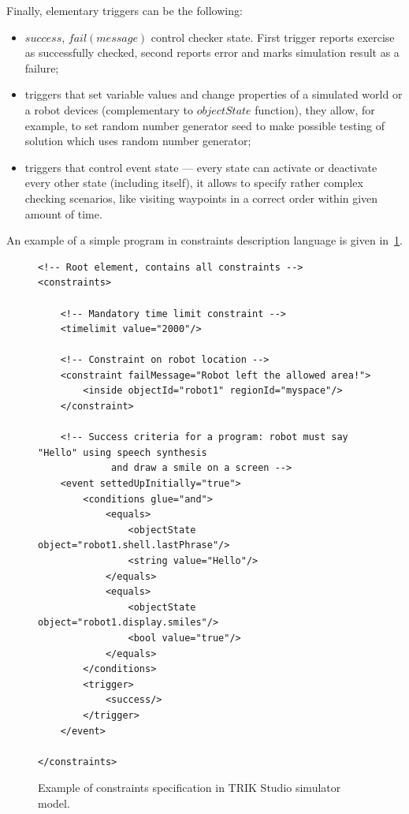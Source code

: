 \documentclass[conference]{IEEEtran}
\begin{document}
{Finally, elementary triggers can be the following:
\begin{itemize}
    \item $success$, $fail(message)$ control checker state. First trigger reports exercise as successfully checked, second reports error and marks simulation result as a failure;
    \item triggers that set variable values and change properties of a simulated world or a robot devices (complementary to $objectState$ function), they allow, for example, to set random number generator seed to make possible testing of solution which uses random number generator;
    \item triggers that control event state --- every state can activate or deactivate every other state (including itself), it allows to specify rather complex checking scenarios, like visiting waypoints in a correct order within given amount of time.
\end{itemize}

An example of a simple program in constraints description language is given in~\ref{code:constraints}.

\captionsetup[figure]{name=Listing}
\setcounter{figure}{0}

\begin{figure}[!t]
\begin{verbatim}
<!-- Root element, contains all constraints -->
<constraints>

    <!-- Mandatory time limit constraint -->
    <timelimit value="2000"/>

    <!-- Constraint on robot location -->
    <constraint failMessage="Robot left the allowed area!">
        <inside objectId="robot1" regionId="myspace"/>
    </constraint>

    <!-- Success criteria for a program: robot must say "Hello" using speech synthesis 
		     and draw a smile on a screen -->
    <event settedUpInitially="true">
        <conditions glue="and">
            <equals>
                <objectState object="robot1.shell.lastPhrase"/>
                <string value="Hello"/>
            </equals>
            <equals>
                <objectState object="robot1.display.smiles"/>
                <bool value="true"/>
            </equals>
        </conditions>
        <trigger>
            <success/>
        </trigger>
    </event>

</constraints>
\end{verbatim}
\caption{Example of constraints specification in TRIK Studio simulator model.}
\label{code:constraints}
\end{figure}

}
\end{document}
